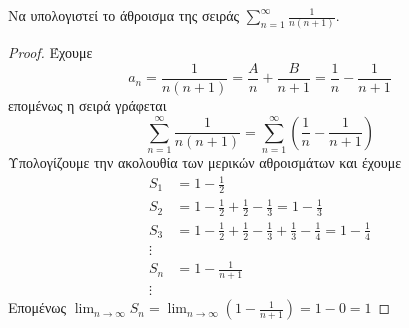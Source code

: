 \documentclass[a4paper,table]{report}
\begin{document}
\begin{examples}
\item {}
    \begin{enumerate}
        \item Να υπολογιστεί το άθροισμα της σειράς $ \sum_{n=1}^{\infty} 
            \frac{1}{n(n+1)} $.
            \begin{proof}
            \item 
                Έχουμε
                \[
                    a_{n} = \frac{1}{n(n+1)} = \frac{A}{n} + \frac{B}{n+1} = 
                    \frac{1}{n} - \frac{1}{n+1} 
                \]
                επομένως η σειρά γράφεται
                \[
                    \sum_{n=1}^{\infty} \frac{1}{n(n+1)} = 
                    \sum_{n=1}^{\infty} \left(\frac{1}{n} - \frac{1}{n+1}\right) 
                \] 
                Υπολογίζουμε την ακολουθία των μερικών αθροισμάτων και έχουμε
                \begin{align*}
                    S_{1} &= 1- \frac{1}{2} \\
                    S_{2} &= 1- \frac{1}{2} + \frac{1}{2} - \frac{1}{3} = 
                    1 - \frac{1}{3}  \\
                    S_{3} &=  1- \frac{1}{2} + \frac{1}{2} - \frac{1}{3} + 
                    \frac{1}{3} - \frac{1}{4} = 1 - \frac{1}{4}  \\
                    \vdots \\
                    S_{n} &= 1 - \frac{1}{n+1} \\
                    \vdots
                \end{align*}
            Επομένως $ \lim_{n \to \infty} S_{n} = 
            \lim_{n \to \infty} \left(1 - \frac{1}{n+1}\right) = 1 - 0 = 1 $
        \end{proof}


\end{enumerate}
\end{examples}
\end{document}
